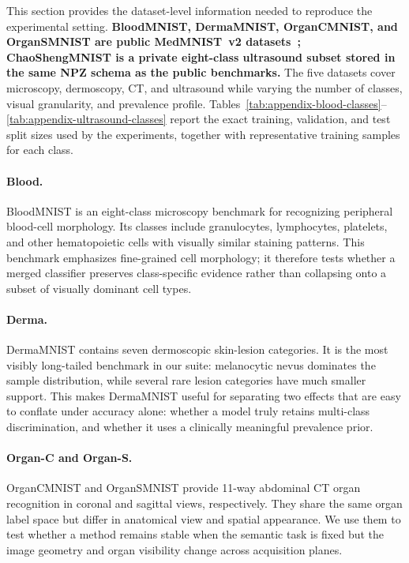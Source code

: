 \documentclass[letterpaper]{article}
\theoremstyle{definition}
\theoremstyle{plain}
\begin{document}
This section provides the dataset-level information needed to reproduce the experimental setting. \textbf{BloodMNIST, DermaMNIST, OrganCMNIST, and OrganSMNIST are public MedMNIST~v2 datasets~\citep{yang2023medmnist}; ChaoShengMNIST is a private eight-class ultrasound subset stored in the same NPZ schema as the public benchmarks.} The five datasets cover microscopy, dermoscopy, CT, and ultrasound while varying the number of classes, visual granularity, and prevalence profile. Tables~\ref{tab:appendix-blood-classes}--\ref{tab:appendix-ultrasound-classes} report the exact training, validation, and test split sizes used by the experiments, together with representative training samples for each class.

\paragraph{Blood.} BloodMNIST is an eight-class microscopy benchmark for recognizing peripheral blood-cell morphology. Its classes include granulocytes, lymphocytes, platelets, and other hematopoietic cells with visually similar staining patterns. This benchmark emphasizes fine-grained cell morphology; it therefore tests whether a merged classifier preserves class-specific evidence rather than collapsing onto a subset of visually dominant cell types.

\paragraph{Derma.} DermaMNIST contains seven dermoscopic skin-lesion categories. It is the most visibly long-tailed benchmark in our suite: melanocytic nevus dominates the sample distribution, while several rare lesion categories have much smaller support. This makes DermaMNIST useful for separating two effects that are easy to conflate under accuracy alone: whether a model truly retains multi-class discrimination, and whether it uses a clinically meaningful prevalence prior.

\paragraph{Organ-C and Organ-S.} OrganCMNIST and OrganSMNIST provide 11-way abdominal CT organ recognition in coronal and sagittal views, respectively. They share the same organ label space but differ in anatomical view and spatial appearance. We use them to test whether a method remains stable when the semantic task is fixed but the image geometry and organ visibility change across acquisition planes.
\end{document}
